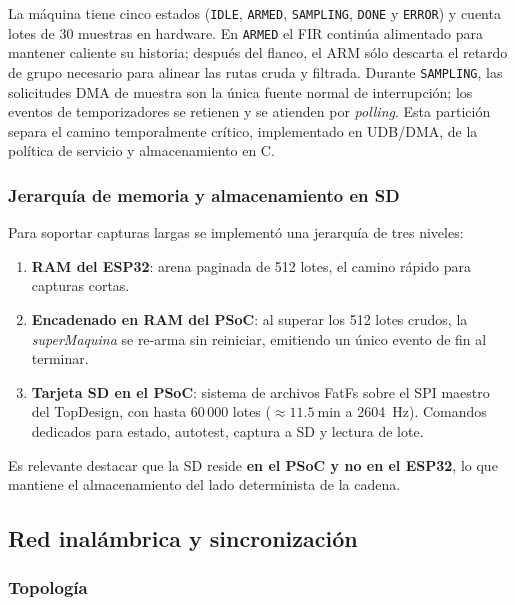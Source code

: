 La m\'aquina tiene cinco estados (\texttt{IDLE}, \texttt{ARMED},
\texttt{SAMPLING}, \texttt{DONE} y \texttt{ERROR}) y cuenta lotes de 30 muestras en
hardware. En \texttt{ARMED} el FIR contin\'ua alimentado para mantener caliente su
historia; despu\'es del flanco, el ARM s\'olo descarta el retardo de grupo necesario para
alinear las rutas cruda y filtrada. Durante \texttt{SAMPLING}, las solicitudes DMA de
muestra son la \'unica fuente normal de interrupci\'on; los eventos de temporizadores se
retienen y se atienden por \emph{polling}. Esta partici\'on separa el camino temporalmente
cr\'itico, implementado en UDB/DMA, de la pol\'itica de servicio y almacenamiento en C.

\subsubsection{Jerarqu\'ia de memoria y almacenamiento en SD}

Para soportar capturas largas se implement\'o una jerarqu\'ia de tres niveles:

\begin{enumerate}[itemsep=0.15em]
    \item \textbf{RAM del ESP32}: arena paginada de 512 lotes, el camino r\'apido para
    capturas cortas.
    \item \textbf{Encadenado en RAM del PSoC}: al superar los 512 lotes crudos, la
    \emph{superMaquina} se re-arma sin reiniciar, emitiendo un \'unico evento de fin al
    terminar.
    \item \textbf{Tarjeta SD en el PSoC}: sistema de archivos FatFs sobre el SPI maestro
    del TopDesign, con hasta 60\,000 lotes ($\approx\SI{11.5}{\minute}$ a
    \SI{2604}{\hertz}). Comandos dedicados para estado, autotest, captura a SD y
    lectura de lote.
\end{enumerate}

Es relevante destacar que la SD reside \textbf{en el PSoC y no en el ESP32}, lo que
mantiene el almacenamiento del lado determinista de la cadena.

\subsection{Red inal\'ambrica y sincronizaci\'on}

\subsubsection{Topolog\'ia}

